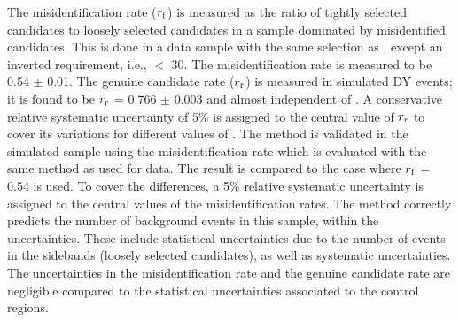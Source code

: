 The misidentification rate ($r_{\rm f}$) is measured as the ratio of tightly selected \Tau candidates to loosely 
selected \Tau candidates in a sample dominated by misidentified \Tau candidates. 
This is done in a data sample with the same selection as \leptonTau, except an inverted
\MPT requirement, i.e., \MPT $<$ 30\GeV. The misidentification rate is measured to be 0.54 $\pm$ 0.01.
The genuine \Tau candidate rate ($r_{\rm r}$) is measured in simulated DY events; it is found to 
be $r_{\rm r}$ = 0.766 $\pm$ 0.003 and almost independent of \mttwo. 
A conservative relative systematic uncertainty of 5\% is assigned to the central value of $r_{\rm r}$ to cover its 
variations for different values of \mttwo.
The method is validated in the simulated \wjets sample using the misidentification rate which is evaluated with the same method as used for data. 
The result is compared to the case where $r_{\rm f}$ = 0.54 is used. To cover the differences, a 5\% relative systematic uncertainty is
assigned to the central values of the misidentification rates.
The method correctly predicts the number of \leptonTau background events in this sample, within the 
uncertainties.
These include statistical uncertainties due to the number of events in the 
sidebands (loosely selected \Tau candidates), as well as 
systematic uncertainties.
The uncertainties in the %
misidentification rate and the genuine \Tau candidate rate %
are negligible compared to the statistical uncertainties associated to 
the control regions. 

